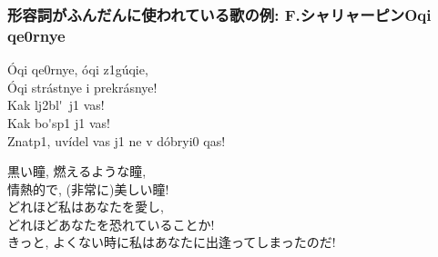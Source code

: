 \documentclass[11pt]{jsarticle}
\begin{document}
\subsubsection*{形容詞がふんだんに使われている歌の例: F.シャリャーピン\flqq{}Oqi q{e0}rnye\frqq}
\begin{multicolpar}{2}
\noindent
\'Oqi q{e0}rnye, \'oqi {z1}g\'uqie,\\
\'Oqi str\'astnye i prekr\'asnye!\\
Kak l{j2}bl\'\cyryu\ {j1} vas!\\
Kak bo\'\cyryu{}s{p1} {j1} vas!\\
Znat{p1}, uv\'idel vas {j1} ne v d\'obry{i0} qas!

\noindent
黒い瞳, 燃えるような瞳,\\
情熱的で, (非常に)美しい瞳!\\
どれほど私はあなたを愛し,\\
どれほどあなたを恐れていることか!\\
きっと, よくない時に私はあなたに出逢ってしまったのだ!
\end{multicolpar}
\end{document}
